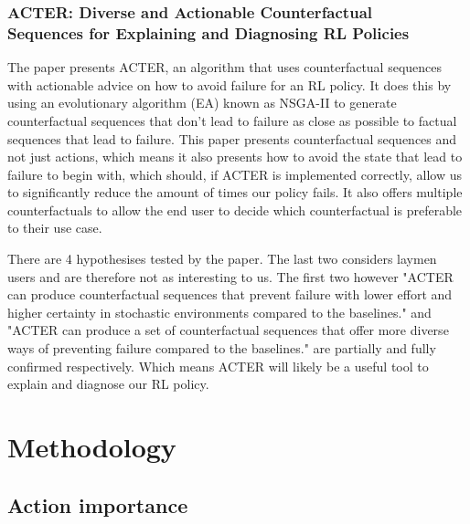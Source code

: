 \documentclass[UKenglish]{uiomasterthesis}
\begin{document}
\subsection{ ACTER: Diverse and Actionable Counterfactual\\ Sequences for Explaining and Diagnosing RL Policies}
\label{sec:acter}
The paper presents ACTER, an algorithm that uses counterfactual sequences with actionable advice on how to avoid failure for an RL policy. It does this by using an evolutionary algorithm (EA) known as NSGA-II to generate counterfactual sequences that don't lead to failure as close as possible to factual sequences that lead to failure. This paper presents counterfactual sequences and not just actions, which means it also presents how to avoid the state that lead to failure to begin with, which should, if ACTER is implemented correctly, allow us to significantly reduce the amount of times our policy fails. It also offers multiple counterfactuals to allow the end user to decide which counterfactual is preferable to their use case.

There are 4 hypothesises tested by the paper. The last two considers laymen users and are therefore not as interesting to us. The first two however "ACTER can produce counterfactual sequences that prevent failure with lower effort and higher certainty in stochastic environments compared to the baselines." and "ACTER can produce a set of counterfactual sequences that offer more diverse ways of preventing failure compared to the baselines." are partially and fully confirmed respectively. Which means ACTER will likely be a useful tool to explain and diagnose our RL policy.


\medskip
\chapter{Methodology}

\section{Action importance}
\end{document}
